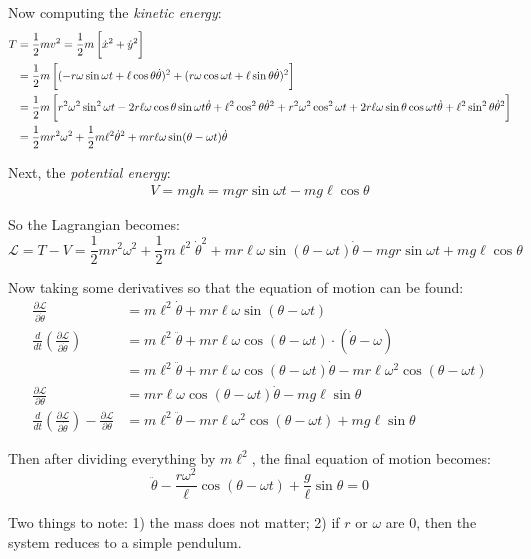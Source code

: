 \documentclass[letterpaper,8pt]{article}
\begin{document}
Now computing the \emph{kinetic energy}:
\begin{align*}
T &= \frac{1}{2} mv^2 = \frac{1}{2} m \left[ \vphantom{\frac{1}{2}} \dot{x}^2 + \dot{y}^2 \right] \\
  &= \frac{1}{2} m \left[ \vphantom{\frac{1}{2}} (-r\omega \sin\omega t + \ell \cos \theta \dot{\theta})^2 
                          + (r\omega \cos \omega t + \ell \sin \theta \dot{\theta})^2 \right] \\
  &= \frac{1}{2} m \left[ \vphantom{\frac{1}{2}} r^2 \omega^2 \sin^2 \omega t - 2r\ell \omega \cos\theta\sin\omega t \dot{\theta} + \ell^2\cos^2\theta \dot{\theta}^2
                   + r^2\omega^2 \cos^2\omega t + 2r\ell\omega\sin\theta\cos\omega t\dot{\theta} + \ell^2\sin^2\theta \dot{\theta}^2 \right] \\
  &= \frac{1}{2} m r^2\omega^2 + \frac{1}{2} m\ell^2 \dot{\theta}^2 + mr\ell\omega \sin(\theta - \omega t)\dot{\theta}
\end{align*}

Next, the \emph{potential energy}:
\begin{align*}
V = mgh = mgr \sin \omega t - mg \ell \cos \theta
\end{align*}

So the Lagrangian becomes:
\[
\mathcal{L} = T - V = \frac{1}{2} m r^2\omega^2 + \frac{1}{2} m\ell^2 \dot{\theta}^2 + mr\ell\omega \sin(\theta - \omega t)\dot{\theta} - mgr \sin \omega t + mg \ell \cos \theta
\]

Now taking some derivatives so that the equation of motion can be found:
\begin{align*}
\frac{\partial \mathcal{L}}{\partial \dot{\theta}} &= m\ell^2 \dot{\theta} + mr\ell\omega \sin (\theta - \omega t) \\
\frac{d}{dt} \left( \frac{\partial \mathcal{L}}{\partial \dot{\theta}} \right) &= 
            m\ell^2 \ddot{\theta} + mr\ell\omega \cos (\theta - \omega t)\cdot(\dot{\theta} - \omega) \\
           &= m\ell^2 \ddot{\theta} + mr\ell\omega \cos (\theta - \omega t)\dot{\theta} - mr\ell\omega^2 \cos (\theta - \omega t) \\
\frac{\partial \mathcal{L}}{\partial \theta} &= mr\ell\omega \cos (\theta - \omega t)\dot{\theta} - mg\ell\sin\theta  \\
\frac{d}{dt} \left( \frac{\partial \mathcal{L}}{\partial \dot{\theta}} \right) - \frac{\partial \mathcal{L}}{\partial \theta} &=
            m\ell^2 \ddot{\theta} - mr\ell\omega^2 \cos(\theta - \omega t) + mg\ell\sin\theta 
\end{align*}

Then after dividing everything by $m\ell^2$, the final equation of motion becomes:
\[
\ddot{\theta} - \frac{r\omega^2}{\ell} \cos(\theta - \omega t) + \frac{g}{\ell}\sin \theta = 0
\]

Two things to note: 1) the mass does not matter; 2) if $r$ or $\omega$ are 0, then the system reduces to a simple pendulum.
\end{document}
